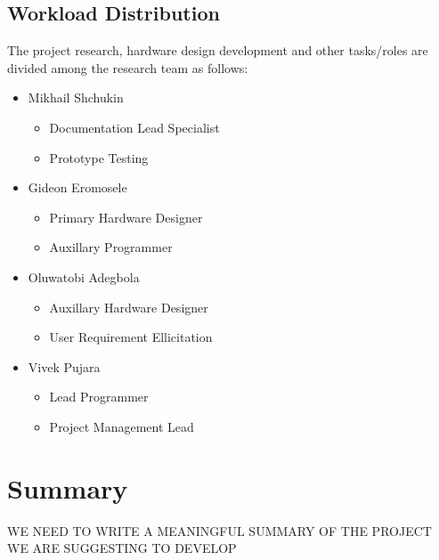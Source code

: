 \documentclass[journal]{IEEEtran}
\begin{document}
\subsection{Workload Distribution}
The project research, hardware design development and other tasks/roles are divided among the research team as follows:
\begin{itemize}
\item{Mikhail Shchukin}
	\begin{itemize}
	\item{Documentation Lead Specialist}
	\item{Prototype Testing}
	\end{itemize} 
\item{Gideon Eromosele}
	\begin{itemize}
	\item{Primary Hardware Designer}
	\item{Auxillary Programmer}
	\end{itemize} 
\item{Oluwatobi Adegbola}
	\begin{itemize}
	\item{Auxillary Hardware Designer}
	\item{User Requirement Ellicitation}
	\end{itemize} 
\item{Vivek Pujara}
	\begin{itemize}
	\item{Lead Programmer}
	\item{Project Management Lead}
	\end{itemize} 
\end{itemize} 


\section{Summary}
WE NEED TO WRITE A MEANINGFUL SUMMARY OF THE PROJECT WE ARE SUGGESTING TO DEVELOP


\ifCLASSOPTIONcaptionsoff
  \newpage
\fi


%
%
%


\end{document}
